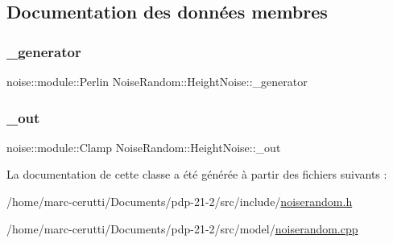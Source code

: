 \subsection{Documentation des données membres}
\mbox{\label{class_noise_random_1_1_height_noise_a537d769e59cef8e6691238c9f838510f}} 
\subsubsection{\texorpdfstring{\+\_\+generator}{\_generator}}
{\footnotesize\ttfamily noise\+::module\+::\+Perlin Noise\+Random\+::\+Height\+Noise\+::\+\_\+generator\hspace{0.3cm}{\ttfamily [private]}}

\mbox{\label{class_noise_random_1_1_height_noise_a5e4713b2a4522778d1478cdf75339658}} 
\subsubsection{\texorpdfstring{\+\_\+out}{\_out}}
{\footnotesize\ttfamily noise\+::module\+::\+Clamp Noise\+Random\+::\+Height\+Noise\+::\+\_\+out\hspace{0.3cm}{\ttfamily [private]}}



La documentation de cette classe a été générée à partir des fichiers suivants \+:\begin{DoxyCompactItemize}
\item 
/home/marc-\/cerutti/\+Documents/pdp-\/21-\/2/src/include/\hyperlink{noiserandom_8h}{noiserandom.\+h}\item 
/home/marc-\/cerutti/\+Documents/pdp-\/21-\/2/src/model/\hyperlink{noiserandom_8cpp}{noiserandom.\+cpp}\end{DoxyCompactItemize}
